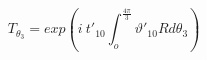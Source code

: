 \begin{equation}
T_{\theta_3}= exp\left( i~t'_{10}\int_o^{\frac{4\pi}{3}}\vartheta'_{10} R 
d\theta_3 \right )
\end{equation}

